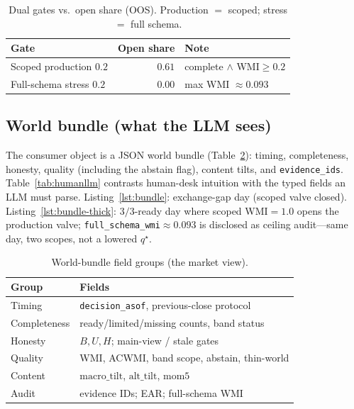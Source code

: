 \documentclass[sigconf,anonymous]{acmart}
\theoremstyle{acmdefinition}%
\theoremstyle{acmplain}%
\begin{document}
\begin{table}[t]
  \caption{Dual gates vs.\ open share (OOS). Production $=$ scoped; stress $=$ full schema.}
  \label{tab:wmi}
  \small
  \begin{tabular}{@{}lrl@{}}
    \toprule
    Gate & Open share & Note \\
    \midrule
    Scoped production \(0.2\) & \(0.61\) & complete \(\wedge\) WMI\(\ge 0.2\) \\
    Full-schema stress \(0.2\) & \(0.00\) & max WMI \({\approx}0.093\) \\
    \bottomrule
  \end{tabular}
\end{table}

\subsection{World bundle (what the LLM sees)}
The consumer object is a JSON world bundle (Table~\ref{tab:schema}): timing, completeness, honesty, quality (including the abstain flag), content tilts, and \texttt{evidence\_ids}.
Table~\ref{tab:humanllm} contrasts human-desk intuition with the typed fields an LLM must parse.
Listing~\ref{lst:bundle}: exchange-gap day (scoped valve closed).
Listing~\ref{lst:bundle-thick}: \(3/3\)-ready day where scoped WMI\({=}1.0\) opens the production valve; \texttt{full\_schema\_wmi}\({\approx}0.093\) is disclosed as ceiling audit---same day, two scopes, not a lowered \(q^\star\).

\begin{table}[H]
  \caption{World-bundle field groups (the market view).}
  \label{tab:schema}
  \small
  \begin{tabular}{@{}ll@{}}
    \toprule
    Group & Fields \\
    \midrule
    Timing & \texttt{decision\_asof}, previous-close protocol \\
    Completeness & ready/limited/missing counts, band status \\
    Honesty & \(B,U,H\); main-view / stale gates \\
    Quality & WMI, ACWMI, band scope, abstain, thin-world \\
    Content & \(\mathrm{macro\_tilt}\), \(\mathrm{alt\_tilt}\), \(\mathrm{mom5}\) \\
    Audit & evidence IDs; EAR; full-schema WMI \\
    \bottomrule
  \end{tabular}
\end{table}
\end{document}
